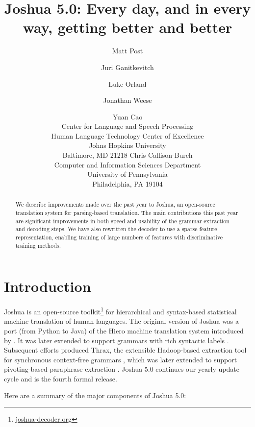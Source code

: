 \documentclass[11pt]{article}
\title{Joshua 5.0: Every day, and in every way, getting better and better}
\author{Matt Post\hltcoe 
  \and Juri Ganitkevitch\clsp 
  \and Luke Orland\hltcoe
  \and Jonathan Weese\clsp
  \and Yuan Cao\clsp  \\
  \clsp Center for Language and Speech Processing \\
  \hltcoe Human Language Technology Center of Excellence \\
  Johns Hopkins University \\
  Baltimore, MD 21218
  \AND  Chris Callison-Burch \\
  Computer and Information Sciences Department \\
  University of Pennsylvania \\
  Philadelphia, PA 19104
}
\date{}
\begin{document}
\maketitle

\begin{abstract}
  We describe improvements made over the past year to Joshua, an
  open-source translation system for parsing-based translation. The
  main contributions this past year are significant improvements in
  both speed and usability of the grammar extraction and decoding
  steps. We have also rewritten the decoder to use a sparse feature
  representation, enabling training of large numbers of features with
  discriminative training methods.
\end{abstract}

\section{Introduction}
\label{sec-intro}

Joshua is an open-source toolkit\footnote{\url{joshua-decoder.org}}
for hierarchical and syntax-based statistical machine translation of
human languages.  The original version of Joshua \cite{Joshua-WMT} was
a port (from Python to Java) of the Hiero machine translation system
introduced by .  It was later extended to support
grammars with rich syntactic labels \cite{li2010joshua}. Subsequent
efforts produced Thrax, the extensible Hadoop-based extraction tool
for synchronous context-free grammars \cite{Joshua-3.0}, which was
later extended to support pivoting-based paraphrase extraction
\cite{Joshua-4.0}. Joshua 5.0 continues our yearly update cycle and is
the fourth formal release.

Here are a summary of the major components of Joshua 5.0:
\end{document}
